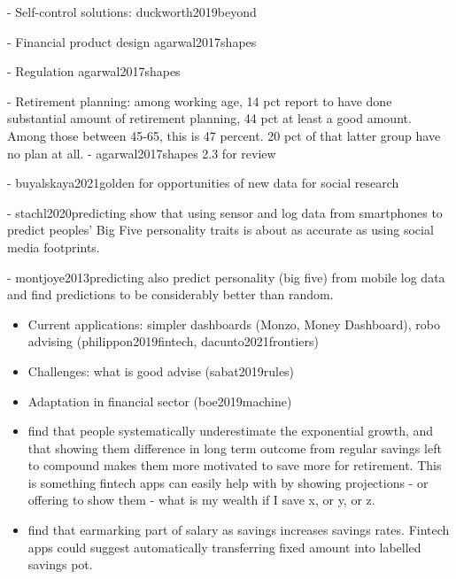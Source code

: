 
- Self-control solutions: duckworth2019beyond



- Financial product design agarwal2017shapes

- Regulation agarwal2017shapes





- Retirement planning: among working age, 14 pct report to have done
substantial amount of retirement planning, 44 pct at least a good amount. Among
those between 45-65, this is 47 percent. 20 pct of that latter group have no
plan at all. 
- agarwal2017shapes 2.3 for review





- buyalskaya2021golden for opportunities of new data for social research

- stachl2020predicting show that using sensor and log data from smartphones to
predict peoples' Big Five personality traits is about as accurate as using
social media footprints.

- montjoye2013predicting also predict personality (big five) from mobile log
data and find predictions to be considerably better than random.



\begin{itemize}
    \item Current applications: simpler dashboards (Monzo, Money Dashboard),
        robo advising (philippon2019fintech, dacunto2021frontiers)

    \item Challenges: what is good advise (sabat2019rules)

    \item Adaptation in financial sector (boe2019machine)

    \item \citet{mckenzie2011misunderstanding} find that people systematically
        underestimate the exponential growth, and that showing them difference
        in long term outcome from regular savings left to compound makes them
        more motivated to save more for retirement. This is something fintech
        apps can easily help with by showing projections - or offering to show
        them - what is my wealth if I save x, or y, or z.

    \item \citet{soman2011earmarking} find that earmarking part of salary as
        savings increases savings rates. Fintech apps could suggest
        automatically transferring fixed amount into labelled savings pot.
\end{itemize}

